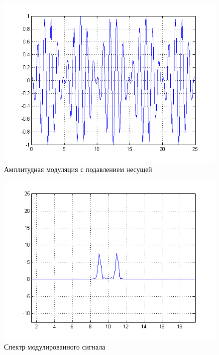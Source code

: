 \begin{figure}[H]
   \includegraphics[scale=0.7]{lab7/ammod.png}
   \caption{Амплитудная модуляция с подавлением несущей}
\end{figure}

\begin{figure}[H]
   \includegraphics[scale=0.7]{lab7/ammod_spectro.png}
   \caption{Спектр модулированного сигнала}
\end{figure}

